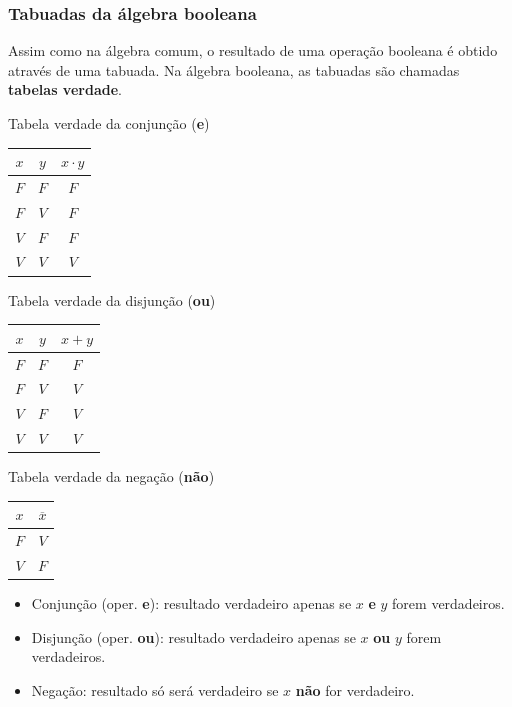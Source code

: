 \documentclass{beamer}
\begin{document}
\begin{frame}
 \frametitle{Tabuadas da álgebra booleana}

 Assim como na álgebra comum, o resultado de uma operação booleana é obtido
através de uma tabuada. Na álgebra booleana, as tabuadas são chamadas
\textbf{tabelas verdade}.\\[12pt]

\pause

\hspace{4ex}
%
\begin{minipage}{16ex}
\centering
Tabela verdade da conjunção (\textbf{e})\\[6pt]
\begin{tabular}{cc|c}
 $x$ & $y$ & $x \cdot y$ \\
\hline
 $F$ & $F$ & $F$ \\
 $F$ & $V$ & $F$ \\
 $V$ & $F$ & $F$ \\
 $V$ & $V$ & $V$
\end{tabular}
\end{minipage}
%
\hspace{3ex}
%
\begin{minipage}{18ex}
\centering
Tabela verdade da disjunção  (\textbf{ou})\\[6pt]
\begin{tabular}{cc|c}
 $x$ & $y$ & $x + y$ \\
\hline
 $F$ & $F$ & $F$ \\
 $F$ & $V$ & $V$ \\
 $V$ & $F$ & $V$ \\
 $V$ & $V$ & $V$
\end{tabular}
\end{minipage}
%
\hspace{3ex}
%
\begin{minipage}{18ex}
\centering
Tabela verdade da negação  (\textbf{não})\\[12pt]
\begin{tabular}{c|c}
 $x$ & $\overline{x}$ \\
\hline
 $F$ & $V$ \\
 $V$ & $F$
\end{tabular}
\end{minipage}

\pause

\begin{itemize}
 \item Conjunção (oper. \textbf{e}): resultado
verdadeiro apenas se $x$ \textbf{e} $y$ forem verdadeiros.
\pause
 \item Disjunção (oper. \textbf{ou}): resultado
verdadeiro apenas se $x$ \textbf{ou} $y$ forem verdadeiros.
\pause
 \item Negação: resultado só será verdadeiro se $x$ \textbf{não} for
verdadeiro.
\end{itemize}

\end{frame}
\end{document}
